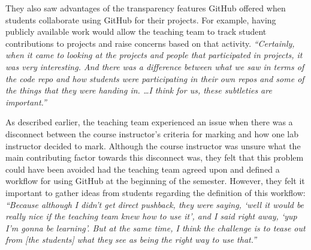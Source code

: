 They also saw advantages of the transparency features GitHub offered when students collaborate using GitHub for their projects. For example, having publicly available work would allow the teaching team to track student contributions to projects and raise concerns based on that activity. \textit{``Certainly, when it came to looking at the projects and people that participated in projects, it was very interesting. And there was a difference between what we saw in terms of the code repo and how students were participating in their own repos and some of the things that they were handing in. \ldots I think for us, these subtleties are important.''}


As described earlier, the teaching team experienced an issue when there was a disconnect between the course instructor's criteria for marking and how one lab instructor decided to mark. Although the course instructor was unsure what the main contributing factor towards this disconnect was, they felt that this problem could have been avoided had the teaching team agreed upon and defined a workflow for using GitHub at the beginning of the semester. However, they felt it important to gather ideas from students regarding the definition of this workflow: \textit{``Because although I didn't get direct pushback, they were saying, `well it would be really nice if the teaching team knew how to use it', and I said right away, `yup I'm gonna be learning'. But at the same time, I think the challenge is to tease out from [the students] what they see as being the right way to use that.''}


